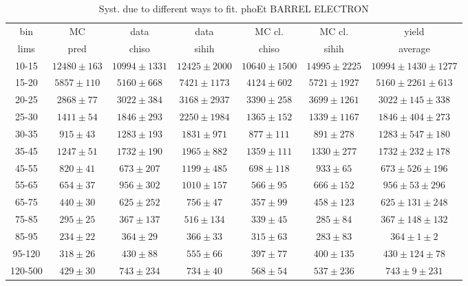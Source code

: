 \begin{table}[h]
  \scriptsize
  \begin{center}
  \caption{Syst. due to different ways to fit. phoEt BARREL ELECTRON}
  \begin{tabular}{|c|c|c|c|c|c|c|}
    bin &  MC   & data  & data  & MC cl. & MC cl. & yield \\ 
    lims & pred & chiso & sihih & chiso  & sihih  & average \\ \hline
    10-15 & $12480\pm163$ & $10994\pm1331$ & $12425\pm2000$ & $10640\pm1500$ & $14995\pm2225$ &$10994\pm1430\pm1277$  \\ \hline
    15-20 & $5857\pm110$ & $5160\pm668$ & $7421\pm1173$ & $4124\pm602$ & $5721\pm1927$ &$5160\pm2261\pm613$  \\ \hline
    20-25 & $2868\pm77$ & $3022\pm384$ & $3168\pm2937$ & $3390\pm258$ & $3699\pm1261$ &$3022\pm145\pm338$  \\ \hline
    25-30 & $1411\pm54$ & $1846\pm293$ & $2250\pm1984$ & $1365\pm152$ & $1339\pm1167$ &$1846\pm404\pm273$  \\ \hline
    30-35 & $915\pm43$ & $1283\pm193$ & $1831\pm971$ & $877\pm111$ & $891\pm278$ &$1283\pm547\pm180$  \\ \hline
    35-45 & $1247\pm51$ & $1732\pm190$ & $1965\pm882$ & $1359\pm111$ & $1330\pm277$ &$1732\pm232\pm178$  \\ \hline
    45-55 & $820\pm41$ & $673\pm207$ & $1199\pm485$ & $698\pm118$ & $933\pm65$ &$673\pm526\pm196$  \\ \hline
    55-65 & $654\pm37$ & $956\pm302$ & $1010\pm157$ & $566\pm95$ & $666\pm152$ &$956\pm53\pm296$  \\ \hline
    65-75 & $440\pm30$ & $625\pm252$ & $756\pm47$ & $357\pm99$ & $458\pm123$ &$625\pm131\pm248$  \\ \hline
    75-85 & $295\pm25$ & $367\pm137$ & $516\pm134$ & $339\pm45$ & $285\pm84$ &$367\pm148\pm132$  \\ \hline
    85-95 & $234\pm22$ & $364\pm29$ & $366\pm33$ & $315\pm63$ & $283\pm83$ &$364\pm1\pm2$  \\ \hline
    95-120 & $318\pm26$ & $430\pm88$ & $555\pm66$ & $397\pm77$ & $400\pm135$ &$430\pm124\pm78$  \\ \hline
    120-500 & $429\pm30$ & $743\pm234$ & $734\pm40$ & $568\pm54$ & $537\pm236$ &$743\pm9\pm231$  \\ \hline
  \end{tabular}
  \label{tab:diff_ways_to_fit_phoEt_BARREL_electron}
  \end{center}
\end{table}

